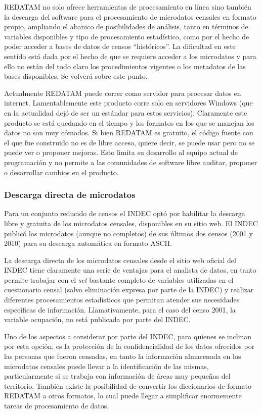 \documentclass[
]{article}
\begin{document}
REDATAM no solo ofrece herramientas de procesamiento en línea sino también la descarga del software para el procesamiento de microdatos censales en formato propio, ampliando el abanico de posibilidades de análisis, tanto en términos de variables disponibles y tipo de procesamiento estadístico, como por el hecho de poder acceder a bases de datos de censos ``históricos''. La dificultad en este sentido está dada por el hecho de que se requiere acceder a los microdatos y para ello no están del todo claro los procedimientos vigentes o los metadatos de las bases disponibles. Se volverá sobre este punto.

Actualmente REDATAM puede correr como servidor para procesar datos en internet. Lamentablemente este producto corre solo en servidores Windows (que en la actualidad dejó de ser un estándar para estos servicios). Claramente este producto se está quedando en el tiempo y los formatos en los que se manejan los datos no son muy cómodos. Si bien REDATAM es gratuito, el código fuente con el que fue construido no es de libre acceso, quiere decir, se puede usar pero no se puede ver o proponer mejoras. Esto limita su desarrollo al equipo actual de programación y no permite a las comunidades de software libre auditar, proponer o desarrollar cambios en el producto.

\hypertarget{descarga-directa-de-microdatos}{%
\subsubsection{Descarga directa de microdatos}\label{descarga-directa-de-microdatos}}

Para un conjunto reducido de censos el INDEC optó por habilitar la descarga libre y gratuita de los microdatos censales, disponibles en su sitio web. El INDEC publicó los microdatos (aunque no completos) de sus últimos dos censos (2001 y 2010) para su descarga automática en formato ASCII.

La descarga directa de los microdatos censales desde el sitio web oficial del INDEC tiene claramente una serie de ventajas para el analista de datos, en tanto permite trabajar con el \emph{set} bastante completo de variables utilizadas en el cuestionario censal (salvo eliminación expresa por parte de la INDEC) y realizar diferentes procesamientos estadísticos que permitan atender sus necesidades específicas de información. Llamativamente, para el caso del censo 2001, la variable ocupación, no está publicada por parte del INDEC.

Uno de los aspectos a considerar por parte del INDEC, para quienes se inclinan por esta opción, es la protección de la confidencialidad de los datos ofrecidos por las personas que fueron censadas, en tanto la información almacenada en los microdatos censales puede llevar a la identificación de las mismas, particularmente si se trabaja con información de áreas muy pequeñas del territorio. También existe la posibilidad de convertir los diccionarios de formato REDATAM a otros formatos, lo cual puede llegar a simplificar enormemente tareas de procesamiento de datos.
\end{document}
